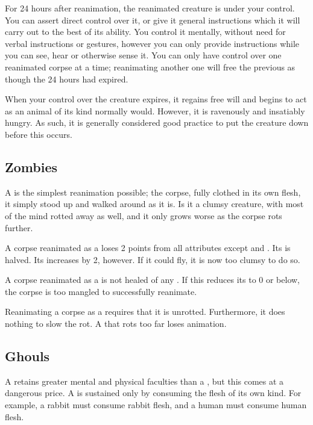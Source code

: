 For 24 hours after reanimation, the reanimated creature is under your control.
You can assert direct control over it, or give it general instructions which it will carry out to the best of its ability.
You control it mentally, without need for verbal instructions or gestures, however you can only provide instructions while you can see, hear or otherwise sense it.
You can only have control over one reanimated corpse at a time; reanimating another one will free the previous as though the 24 hours had expired.

When your control over the creature expires, it regains free will and begins to act as an animal of its kind normally would.
However, it is ravenously and insatiably hungry.
As such, it is generally considered good practice to put the creature down before this occurs.

\subsection{Zombies}

A  is the simplest reanimation possible; the corpse, fully clothed in its own flesh, it simply stood up and walked around as it is.
Is it a clumsy creature, with most of the mind rotted away as well, and it only grows worse as the corpse rots further.

A corpse reanimated as a  loses 2 points from all attributes except  and .
Its  is halved.
Its  increases by 2, however.
If it could fly, it is now too clumsy to do so.

A corpse reanimated as a  is not healed of any {\damage}.
If this reduces its  to 0 or below, the corpse is too mangled to successfully reanimate.

Reanimating a corpse as a  requires that it is unrotted.
Furthermore, it does nothing to slow the rot.
A  that rots too far loses animation.

\subsection{Ghouls}

A  retains greater mental and physical faculties than a , but this comes at a dangerous price.
A  is sustained only by consuming the flesh of its own kind.
For example, a rabbit  must consume rabbit flesh, and a human  must consume human flesh.

